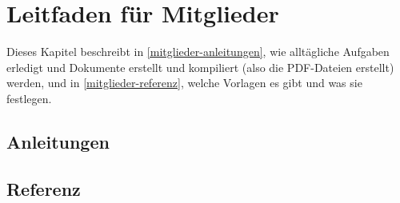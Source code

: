 \chapter{Leitfaden für Mitglieder}
\label{leitfaden-mitglieder}
Dieses Kapitel beschreibt in \autoref{mitglieder-anleitungen}, wie alltägliche Aufgaben erledigt und Dokumente erstellt und kompiliert (also die PDF-Dateien erstellt) werden, und in \autoref{mitglieder-referenz}, welche Vorlagen es gibt und was sie festlegen.

\section{Anleitungen}
\label{mitglieder-anleitungen}






\section{Referenz}
\label{mitglieder-referenz}






